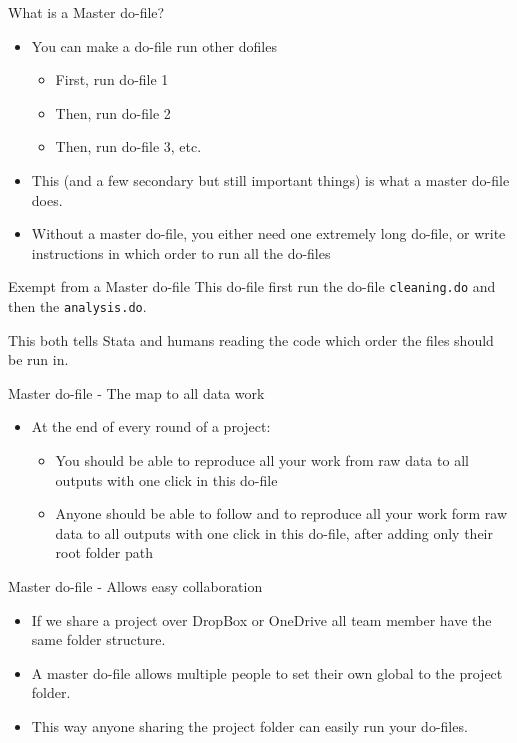 \documentclass[aspectratio=169]{beamer}
\newcommand{\codeexample}[2]{
	\begin{figure}
		\VerbatimInput[
		framesep=3mm,
		frame=lines, %
		numbers=left, %
		label= #1, %
		baselinestretch=0.90, %
		]{#2} %
	\end{figure}
	\FloatBarrier
}
\begin{document}
\begin{frame}{What is a Master do-file?}
\begin{itemize}
	\item You can make a do-file run other dofiles
		\begin{itemize}
			\item 	First, run do-file 1
			\item Then, run do-file 2 
			\item Then, run do-file 3, etc.
		\end{itemize}
	\item This (and a few secondary but still important things) is what a master do-file does.
	\item Without a master do-file, you either need one extremely long do-file, or write instructions in which order to run all the do-files
\end{itemize}
\end{frame}

\begin{frame}{Exempt from a Master do-file}
This do-file first run the do-file \texttt{cleaning.do} and then the \texttt{analysis.do}.
	\codeexample{run-do-from-do.do}{code/run-do-from-do.do}
This both tells Stata and humans reading the code which order the files should be run in.
\end{frame}


\begin{frame}{Master do-file - The map to all data work}
\begin{itemize}
	\item At the end of every round of a project:
	\begin{itemize}
		\item 	You should be able to reproduce all your work from raw data to all outputs with one click in this do-file
		\item Anyone should be able to follow and to reproduce all your work form raw data to all outputs with one click in this do-file, after adding only their root folder path
	\end{itemize}
\end{itemize}
\end{frame}

\begin{frame}[fragile]{Master do-file - Allows easy collaboration}	
	\begin{itemize}
		\item If we share a project over DropBox or OneDrive all team member have the same folder structure.
		
		\item A master do-file allows multiple people to set their own global to the project folder.
		
		\item This way anyone sharing the project folder can easily run your do-files.
		
	\end{itemize}
\end{frame}
\end{document}
